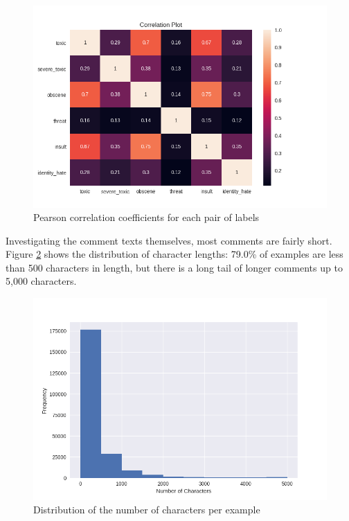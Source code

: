 \documentclass[12pt]{article}
\begin{document}
\begin{figure}
\centering
\includegraphics[width=\textwidth]{label_correlations}
\caption{Pearson correlation coefficients for each pair of labels}
\label{fig:label-corr}
\end{figure}

Investigating the comment texts themselves, most comments are fairly short. Figure \ref{fig:character-dist} shows the distribution of character lengths: 79.0\% of examples are less than 500 characters in length, but there is a long tail of longer comments up to 5,000 characters.

\begin{figure}
\centering
\includegraphics[width=\textwidth]{character_lengths}
\caption{Distribution of the number of characters per example}
\label{fig:character-dist}
\end{figure}
\end{document}
